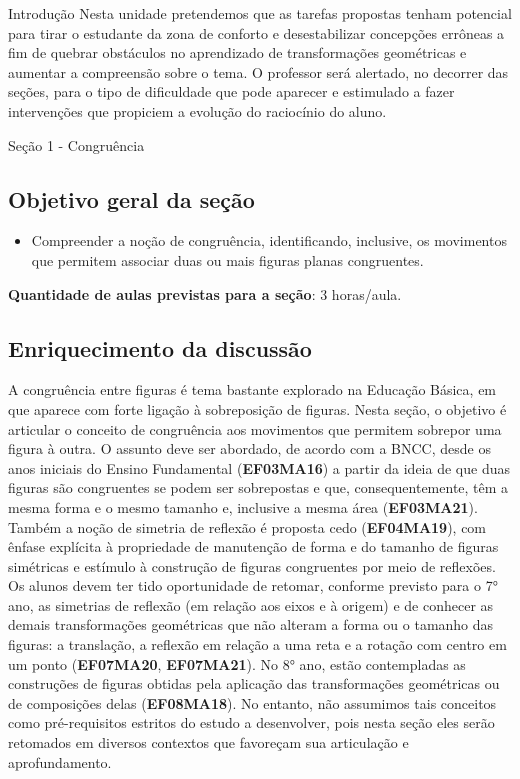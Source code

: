 \begin{apresentacao}{Introdução}
Nesta unidade pretendemos que as tarefas propostas tenham potencial para tirar o estudante da zona de conforto e desestabilizar concepções errôneas a fim de quebrar obstáculos no aprendizado de transformações geométricas e aumentar a compreensão sobre o tema. O professor será alertado, no decorrer das seções, para o tipo de dificuldade que pode aparecer e estimulado a fazer intervenções que propiciem a evolução do raciocínio do aluno.

\end{apresentacao}

\begin{paginatexto}{Seção 1 - Congruência}
\subsection{Objetivo geral da seção}
\begin{itemize}
\item Compreender a noção de congruência, identificando, inclusive, os movimentos que permitem associar duas ou mais figuras planas congruentes.
\end{itemize}

\textbf{Quantidade de aulas previstas para a seção}: 3 horas/aula.

\subsection{Enriquecimento da discussão}
A congruência entre figuras é tema bastante explorado na Educação Básica, em que aparece com forte ligação à sobreposição de figuras. Nesta seção, o objetivo é articular o conceito de congruência aos movimentos que permitem sobrepor uma figura à outra. O assunto deve ser abordado, de acordo com a BNCC, desde os anos iniciais do Ensino Fundamental (\textbf{EF03MA16}) a partir da ideia de que duas figuras são congruentes se podem ser sobrepostas e que, consequentemente, têm a mesma forma e o mesmo tamanho e, inclusive a mesma área (\textbf{EF03MA21}). Também a noção de simetria de reflexão é proposta cedo (\textbf{EF04MA19}), com ênfase explícita à propriedade de manutenção de forma e do tamanho de figuras simétricas e estímulo à construção de figuras congruentes por meio de reflexões.  Os alunos devem ter tido oportunidade de retomar, conforme previsto para o 7° ano, as simetrias de reflexão (em relação aos eixos e à origem) e de conhecer as demais transformações geométricas que não alteram a forma ou o tamanho das figuras: a translação, a reflexão em relação a uma reta e a rotação com centro em um ponto (\textbf{EF07MA20}, \textbf{EF07MA21}). No 8° ano, estão contempladas as construções de figuras obtidas pela aplicação das transformações geométricas ou de composições delas (\textbf{EF08MA18}). No entanto, não assumimos tais conceitos como pré-requisitos estritos do estudo a desenvolver, pois nesta seção eles serão retomados em diversos contextos que favoreçam sua articulação e aprofundamento. 


\end{paginatexto}
